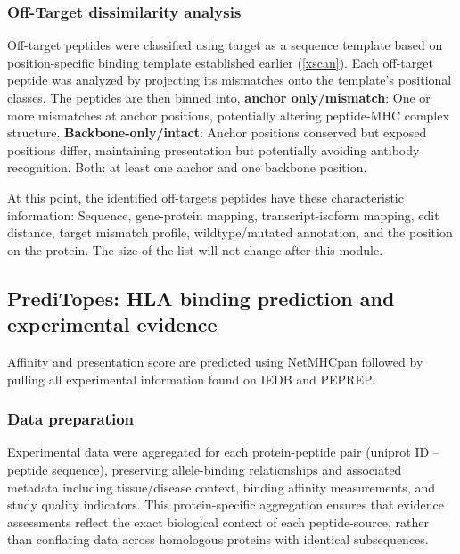 \documentclass[unnumsec,webpdf,contemporary,large]{oup-authoring-template}%
\theoremstyle{thmstyleone}%
\theoremstyle{thmstyletwo}%
\theoremstyle{thmstylethree}%
\begin{document}
        \subsubsection{Off-Target dissimilarity analysis}
            Off-target peptides were classified using target as a sequence template based on position-specific binding template established earlier (\ref{xscan}). Each off-target peptide was analyzed by projecting its mismatches onto the template’s positional classes. The peptides are then binned into, \textbf{anchor only/mismatch}: One or more mismatches at anchor positions, potentially altering peptide-MHC complex structure. \textbf{Backbone-only/intact}: Anchor positions conserved but exposed positions differ, maintaining presentation but potentially avoiding antibody recognition. Both: at least one anchor and one backbone position.

        At this point, the identified off-targets peptides have these characteristic information: Sequence, gene-protein mapping, transcript-isoform mapping, edit distance, target mismatch profile, wildtype/mutated annotation, and the position on the protein. The size of the list will not change after this module. 
        
    \subsection{\textbf{PrediTopes: HLA binding prediction and experimental evidence}}\label{preditipes}
        Affinity and presentation score are predicted using NetMHCpan followed by pulling all experimental information found on IEDB \cite{vita2019immune} and PEPREP. 
        \subsubsection{Data preparation}
            Experimental data were aggregated for each protein-peptide pair (uniprot ID – peptide sequence), preserving allele-binding relationships and associated metadata including tissue/disease context, binding affinity measurements, and study quality indicators. This protein-specific aggregation ensures that evidence assessments reflect the exact biological context of each peptide-source, rather than conflating data across homologous proteins with identical subsequences. 
            
\end{document}
